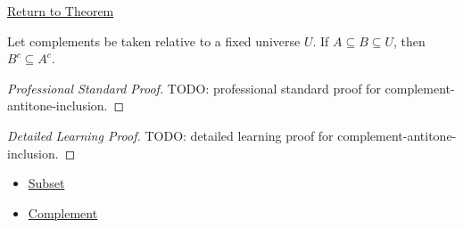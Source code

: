 \newpage
{}
\label{prf:complement-antitone-inclusion}

\begin{remark*}[Return]
\hyperref[thm:complement-antitone-inclusion]{Return to Theorem}
\end{remark*}

\begin{theorem*}
Let complements be taken relative to a fixed universe $U$. If
$A\subseteq B\subseteq U$, then $B^c\subseteq A^c$.
\end{theorem*}

\begin{proof}[Professional Standard Proof]
\LRAProofBodyStart
TODO: professional standard proof for complement-antitone-inclusion.
\end{proof}

\begin{proof}[Detailed Learning Proof]
\LRAProofBodyStart
TODO: detailed learning proof for complement-antitone-inclusion.
\end{proof}

\begin{remark*}
\end{remark*}

\begin{dependencies}
\begin{itemize}
  \item \hyperref[def:subset]{Subset}
  \item \hyperref[def:complement]{Complement}
\end{itemize}
\end{dependencies}

\clearpage
